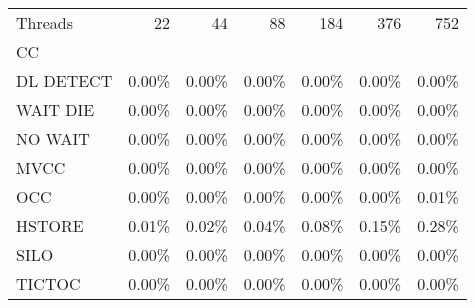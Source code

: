 \begin{tabular}{lrrrrrr}
\toprule
Threads &   22  &   44  &   88  &   184 &   376 &   752 \\
CC        &       &       &       &       &       &       \\
\midrule
DL DETECT & 0.00\% & 0.00\% & 0.00\% & 0.00\% & 0.00\% & 0.00\% \\
WAIT DIE  & 0.00\% & 0.00\% & 0.00\% & 0.00\% & 0.00\% & 0.00\% \\
NO WAIT   & 0.00\% & 0.00\% & 0.00\% & 0.00\% & 0.00\% & 0.00\% \\
MVCC      & 0.00\% & 0.00\% & 0.00\% & 0.00\% & 0.00\% & 0.00\% \\
OCC       & 0.00\% & 0.00\% & 0.00\% & 0.00\% & 0.00\% & 0.01\% \\
HSTORE    & 0.01\% & 0.02\% & 0.04\% & 0.08\% & 0.15\% & 0.28\% \\
SILO      & 0.00\% & 0.00\% & 0.00\% & 0.00\% & 0.00\% & 0.00\% \\
TICTOC    & 0.00\% & 0.00\% & 0.00\% & 0.00\% & 0.00\% & 0.00\% \\
\bottomrule
\end{tabular}
